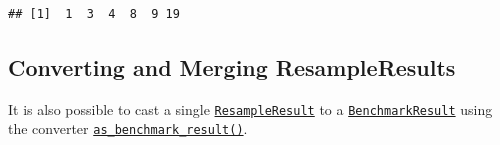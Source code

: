 \documentclass[]{scrbook}
\newenvironment{Shaded}{\begin{snugshade}}{\end{snugshade}}
\newcommand{\CommentTok}[1]{\textcolor[rgb]{0.56,0.35,0.01}{\textit{#1}}}
\newcommand{\KeywordTok}[1]{\textcolor[rgb]{0.13,0.29,0.53}{\textbf{#1}}}
\newcommand{\NormalTok}[1]{#1}
\newcommand{\OperatorTok}[1]{\textcolor[rgb]{0.81,0.36,0.00}{\textbf{#1}}}
\newcommand{\StringTok}[1]{\textcolor[rgb]{0.31,0.60,0.02}{#1}}
\renewenvironment{Shaded} {\begin{snugshade}\small} {\end{snugshade}}
\begin{document}
\begin{Shaded}
\end{Shaded}

\begin{verbatim}
## [1]  1  3  4  8  9 19
\end{verbatim}

\hypertarget{converting-and-merging-resampleresults}{%
\subsection{Converting and Merging ResampleResults}\label{converting-and-merging-resampleresults}}

It is also possible to cast a single \href{https://mlr3.mlr-org.com/reference/ResampleResult.html}{\texttt{ResampleResult}} to a \href{https://mlr3.mlr-org.com/reference/BenchmarkResult.html}{\texttt{BenchmarkResult}} using the converter \href{https://mlr3.mlr-org.com/reference/as_benchmark_result.html}{\texttt{as\_benchmark\_result()}}.

\begin{Shaded}
\end{Shaded}
\end{document}
